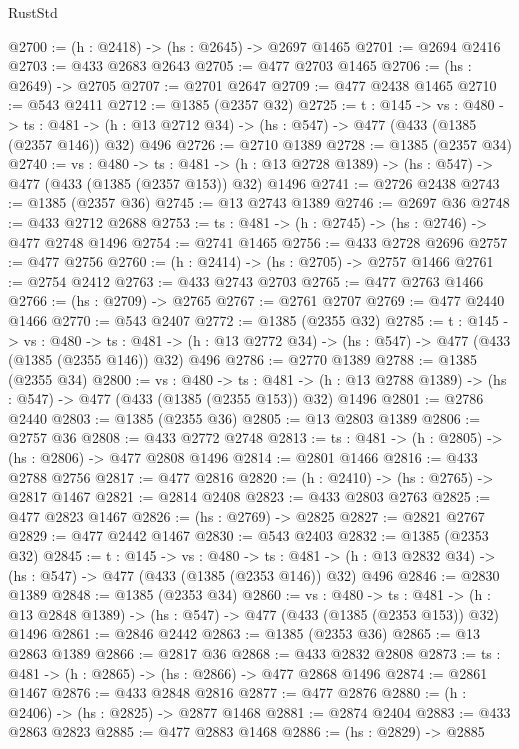 \begin{lexlean}{RustStd}
\begin{coremodule}
@2700 := (h : @2418) -> (hs : @2645) -> @2697 @1465
@2701 := @2694 @2416
@2703 := @433 @2683 @2643
@2705 := @477 @2703 @1465
@2706 := (hs : @2649) -> @2705
@2707 := @2701 @2647
@2709 := @477 @2438 @1465
@2710 := @543 @2411
@2712 := @1385 (@2357 @32)
@2725 := {t : @145} ->
  {vs : @480} ->
  {ts : @481} -> (h : @13 @2712 @34) -> (hs : @547) -> @477 (@433 (@1385 (@2357 @146)) @32) @496
@2726 := @2710 @1389
@2728 := @1385 (@2357 @34)
@2740 := {vs : @480} ->
  {ts : @481} -> (h : @13 @2728 @1389) -> (hs : @547) -> @477 (@433 (@1385 (@2357 @153)) @32) @1496
@2741 := @2726 @2438
@2743 := @1385 (@2357 @36)
@2745 := @13 @2743 @1389
@2746 := @2697 @36
@2748 := @433 @2712 @2688
@2753 := {ts : @481} -> (h : @2745) -> (hs : @2746) -> @477 @2748 @1496
@2754 := @2741 @1465
@2756 := @433 @2728 @2696
@2757 := @477 @2756
@2760 := (h : @2414) -> (hs : @2705) -> @2757 @1466
@2761 := @2754 @2412
@2763 := @433 @2743 @2703
@2765 := @477 @2763 @1466
@2766 := (hs : @2709) -> @2765
@2767 := @2761 @2707
@2769 := @477 @2440 @1466
@2770 := @543 @2407
@2772 := @1385 (@2355 @32)
@2785 := {t : @145} ->
  {vs : @480} ->
  {ts : @481} -> (h : @13 @2772 @34) -> (hs : @547) -> @477 (@433 (@1385 (@2355 @146)) @32) @496
@2786 := @2770 @1389
@2788 := @1385 (@2355 @34)
@2800 := {vs : @480} ->
  {ts : @481} -> (h : @13 @2788 @1389) -> (hs : @547) -> @477 (@433 (@1385 (@2355 @153)) @32) @1496
@2801 := @2786 @2440
@2803 := @1385 (@2355 @36)
@2805 := @13 @2803 @1389
@2806 := @2757 @36
@2808 := @433 @2772 @2748
@2813 := {ts : @481} -> (h : @2805) -> (hs : @2806) -> @477 @2808 @1496
@2814 := @2801 @1466
@2816 := @433 @2788 @2756
@2817 := @477 @2816
@2820 := (h : @2410) -> (hs : @2765) -> @2817 @1467
@2821 := @2814 @2408
@2823 := @433 @2803 @2763
@2825 := @477 @2823 @1467
@2826 := (hs : @2769) -> @2825
@2827 := @2821 @2767
@2829 := @477 @2442 @1467
@2830 := @543 @2403
@2832 := @1385 (@2353 @32)
@2845 := {t : @145} ->
  {vs : @480} ->
  {ts : @481} -> (h : @13 @2832 @34) -> (hs : @547) -> @477 (@433 (@1385 (@2353 @146)) @32) @496
@2846 := @2830 @1389
@2848 := @1385 (@2353 @34)
@2860 := {vs : @480} ->
  {ts : @481} -> (h : @13 @2848 @1389) -> (hs : @547) -> @477 (@433 (@1385 (@2353 @153)) @32) @1496
@2861 := @2846 @2442
@2863 := @1385 (@2353 @36)
@2865 := @13 @2863 @1389
@2866 := @2817 @36
@2868 := @433 @2832 @2808
@2873 := {ts : @481} -> (h : @2865) -> (hs : @2866) -> @477 @2868 @1496
@2874 := @2861 @1467
@2876 := @433 @2848 @2816
@2877 := @477 @2876
@2880 := (h : @2406) -> (hs : @2825) -> @2877 @1468
@2881 := @2874 @2404
@2883 := @433 @2863 @2823
@2885 := @477 @2883 @1468
@2886 := (hs : @2829) -> @2885

\end{coremodule}
\end{lexlean}
